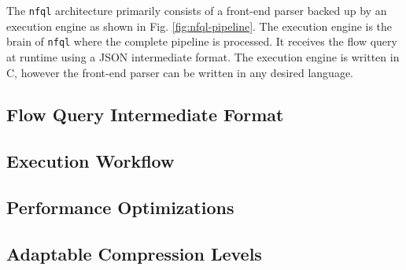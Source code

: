 The \texttt{nfql} architecture primarily consists of a front-end parser backed
up by an execution engine as shown in Fig. \ref{fig:nfql-pipeline}. The
execution engine is the brain of \texttt{nfql} where the complete pipeline is
processed. It receives the flow query at runtime using a JSON \cite{rfc4627}
intermediate format. The execution engine is written in C, however the
front-end parser can be written in any desired language.

\subsection{Flow Query Intermediate Format}

\label{subsec:intermediate-format}

\subsection{Execution Workflow}

\label{subsec:execution-workflow}

\subsection{Performance Optimizations}

\label{subsec:performance-optimizations}

\subsection{Adaptable Compression Levels}

\label{subsec:adaptable-compression-levels}
